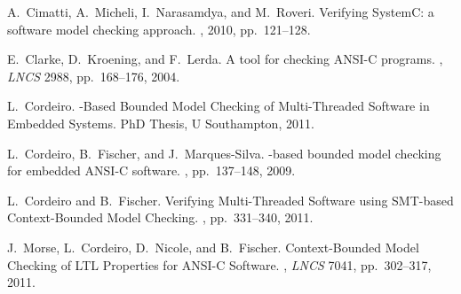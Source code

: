 \documentclass[a4paper]{llncs}
\begin{document}
\vspace{-2.5ex}
\renewcommand\refname{{\normalsize References}}
{\begin{thebibliography}{10}
\vspace{-0.5ex}


A.~Cimatti, A.~Micheli, I.~Narasamdya, and M.~Roveri.
\newblock Verifying {SystemC}: a software model checking approach.
, 2010, pp.\ 121--128.

E.~Clarke, D.~Kroening, and F.~Lerda.
\newblock A tool for checking {ANSI-C} programs.
, {\em LNCS} 2988, pp.\ 168--176, 2004.

L.~Cordeiro.
-Based Bounded Model Checking of Multi-Threaded Software in 
Embedded Systems.
\newblock PhD Thesis, U Southampton, 2011.

L.~Cordeiro, B.~Fischer, and J.~Marques-Silva.
-based bounded model checking for embedded {ANSI-C} software.
, pp.\ 137--148, 2009. 

L.~Cordeiro and B.~Fischer.
\newblock Verifying Multi-Threaded Software using {SMT}-based Context-Bounded 
Model Checking.
, pp.\ 331--340, 2011. 


J.~Morse, L.~Cordeiro, D.~Nicole, and B.~Fischer.
\newblock Context-Bounded Model Checking of LTL Properties for ANSI-C Software.
, {\em LNCS} 7041, pp.\ 302--317, 2011.



\end{thebibliography}}
\end{document}
